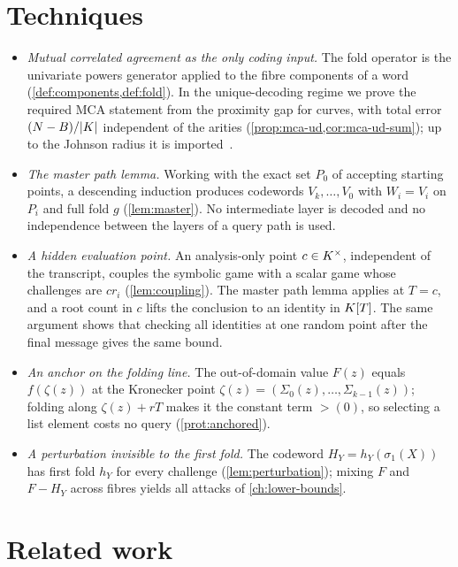 \section*{Techniques}

\begin{itemize}
\item \emph{Mutual correlated agreement as the only coding input.} The fold operator is
the univariate powers generator applied to the fibre components of a word
(\cref{def:components,def:fold}). In the unique-decoding regime we prove the required MCA
statement from the proximity gap for curves, with total error $(N-B)/|K|$ independent of
the arities (\cref{prop:mca-ud,cor:mca-ud-sum}); up to the Johnson radius it is
imported~\cite{BCGM26}.
\item \emph{The master path lemma.} Working with the exact set $P_0$ of accepting starting
points, a descending induction produces codewords $V_k,\dots,V_0$ with
$W_i=V_i$ on $P_i$ and full fold $g$ (\cref{lem:master}). No intermediate layer is
decoded and no independence between the layers of a query path is used.
\item \emph{A hidden evaluation point.} An analysis-only point $c\in K^\times$, independent
of the transcript, couples the symbolic game with a scalar game whose challenges are
$cr_i$ (\cref{lem:coupling}). The master path lemma applies at $T=c$, and a root count in
$c$ lifts the conclusion to an identity in $K[T]$. The same argument shows that checking
all identities at one random point after the final message gives the same bound.
\item \emph{An anchor on the folding line.} The out-of-domain value $F(z)$ equals
$f(\zeta(z))$ at the Kronecker point $\zeta(z)=(\Sigma_0(z),\dots,\Sigma_{k-1}(z))$; folding
along $\zeta(z)+rT$ makes it the constant term $\gt(0)$, so selecting a list element costs
no query (\cref{prot:anchored}).
\item \emph{A perturbation invisible to the first fold.} The codeword
$H_Y=h_Y(\sigma_1(X))$ has first fold $h_Y$ for every challenge
(\cref{lem:perturbation}); mixing $F$ and $F-H_Y$ across fibres yields all attacks of
\cref{ch:lower-bounds}.
\end{itemize}

\section*{Related work}

